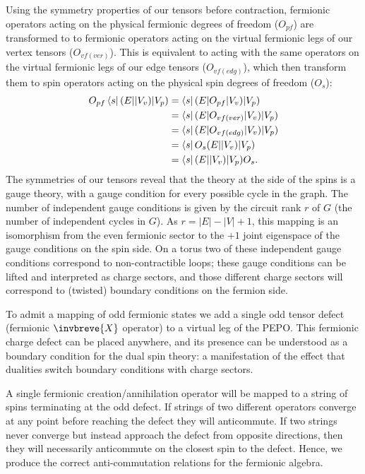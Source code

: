 Using the symmetry properties of our tensors before contraction, fermionic operators acting on the physical fermionic degrees of freedom ($O_{pf}$) are transformed to to fermionic operators acting on the virtual fermionic legs of our vertex tensors ($O_{vf (ver)}$). This is equivalent to acting with the same operators on the virtual fermionic legs of our edge tensors ($O_{vf (edg)}$), which then transform them to spin operators acting on the physical spin degrees of freedom ($O_{s}$):
\begin{align}
    O_{pf}\bra{s}(E|  |V_v)|V_p) &= \bra{s}(E|O_{pf}  |V_v)|V_p)\\
    &= \bra{s}(E| O_{vf (ver)}|V_v)|V_p)\\ 
    &= \bra{s}(E| O_{vf (edg)}|V_v)|V_p)\\
    &= \bra{s}O_s(E| |V_v)|V_p) \\
    &= \bra{s}(E| |V_v)|V_p)O_s.
\end{align}
The symmetries of our tensors reveal that the theory at the side of the spins is a gauge theory, with a gauge condition for every possible cycle in the graph. The number of independent gauge conditions is given by the circuit rank $r$ of $G$ (the number of independent cycles in $G$). As $r = |E| - |V| + 1$, this mapping is an isomorphism from the even fermionic sector to the $+1$ joint eigenspace of the gauge conditions on the spin side. On a torus two of these independent gauge conditions correspond to non-contractible loops; these gauge conditions can be lifted and interpreted as charge sectors, and those different charge sectors will correspond to (twisted) boundary conditions on the fermion side.


To admit a mapping of odd fermionic states we add a single odd tensor defect (fermionic $\invbreve{X}$ operator) to a virtual leg of the PEPO. This fermionic charge defect can be placed anywhere, and its presence can be understood as a boundary condition for the dual spin theory: a manifestation of the effect that dualities switch boundary conditions with charge sectors. 

A single fermionic creation/annihilation operator will be mapped to a string of spins terminating at the odd defect. If strings of two different operators converge at any point before reaching the defect they will anticommute. If two strings never converge but instead approach the defect from opposite directions, then they will necessarily anticommute on the closest spin to the defect. Hence, we produce the correct anti-commutation relations for the fermionic algebra.


